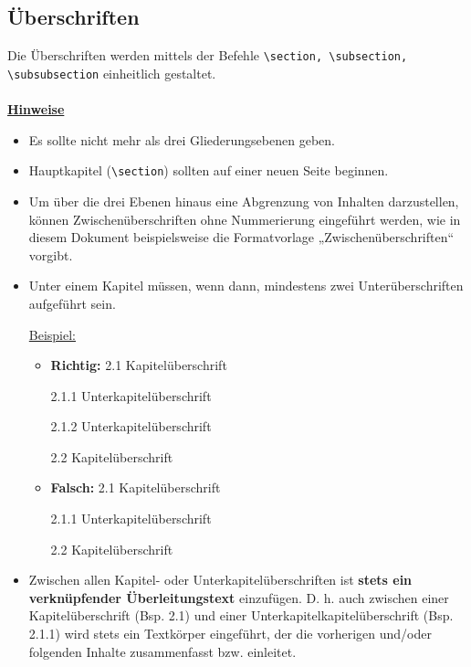 \subsection{Überschriften}
Die Überschriften werden mittels der Befehle \verb!\section, \subsection, \subsubsection! einheitlich gestaltet.\\
\\
\textbf{\uline{Hinweise}}
\begin{itemize}
    \item Es sollte nicht mehr als drei Gliederungsebenen geben.
    \item Hauptkapitel (\verb!\section!) sollten auf einer neuen Seite beginnen.
    \item Um über die drei Ebenen hinaus eine Abgrenzung von Inhalten darzustellen, können Zwischenüberschriften ohne Nummerierung eingeführt werden, wie in diesem Dokument beispielsweise die Formatvorlage „Zwischenüberschriften“ vorgibt. 
    \item Unter einem Kapitel müssen, wenn dann, mindestens zwei Unterüberschriften aufgeführt sein. 


\uline{Beispiel:}
\begin{itemize}
    \item \textbf{Richtig:} 2.1 Kapitelüberschrift
    
    \hspace{20mm} 2.1.1 Unterkapitelüberschrift
    
     \hspace{20mm} 2.1.2 Unterkapitelüberschrift
     
     \hspace{14mm} 2.2 Kapitelüberschrift
    \item \textbf{Falsch:} 2.1 Kapitelüberschrift
    
    \hspace{20mm} 2.1.1 Unterkapitelüberschrift
    
    \hspace{14mm} 2.2 Kapitelüberschrift
\end{itemize}

\item Zwischen allen Kapitel- oder Unterkapitelüberschriften ist \textbf{stets ein verknüpfender Überleitungstext} einzufügen. D. h. auch zwischen einer Kapitelüberschrift (Bsp. 2.1) und einer Unterkapitelkapitelüberschrift (Bsp. 2.1.1) wird stets ein Textkörper eingeführt, der die vorherigen und/oder folgenden Inhalte zusammenfasst bzw. einleitet. 
\end{itemize}

